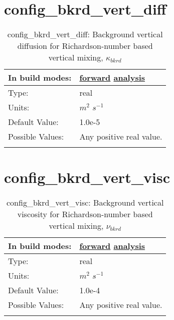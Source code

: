\section[config\_bkrd\_vert\_diff]{config\_bkrd\_vert\_diff}
\label{sec:nm_sec_config_bkrd_vert_diff}
\begin{center}
\begin{longtable}{| p{2.0in} || p{4.0in} |}
    \hline
    In build modes: & \hyperref[subsec:forward_nm_tab_vmix_rich]{forward} \hyperref[subsec:analysis_nm_tab_vmix_rich]{analysis} \\
    \hline
    Type: & real \\
    \hline
    Units: & $m^2$ $s^{-1}$ \\
    \hline
    Default Value: & 1.0e-5 \\
    \hline
    Possible Values: & Any positive real value. \\
    \hline
    \caption{config\_bkrd\_vert\_diff:  Background vertical diffusion for Richardson-number based vertical mixing,  $\kappa_{bkrd}$ }
\end{longtable}
\end{center}
\section[config\_bkrd\_vert\_visc]{config\_bkrd\_vert\_visc}
\label{sec:nm_sec_config_bkrd_vert_visc}
\begin{center}
\begin{longtable}{| p{2.0in} || p{4.0in} |}
    \hline
    In build modes: & \hyperref[subsec:forward_nm_tab_vmix_rich]{forward} \hyperref[subsec:analysis_nm_tab_vmix_rich]{analysis} \\
    \hline
    Type: & real \\
    \hline
    Units: & $m^2$ $s^{-1}$ \\
    \hline
    Default Value: & 1.0e-4 \\
    \hline
    Possible Values: & Any positive real value. \\
    \hline
    \caption{config\_bkrd\_vert\_visc:  Background vertical viscosity for Richardson-number based vertical mixing,  $\nu_{bkrd}$ }
\end{longtable}
\end{center}
